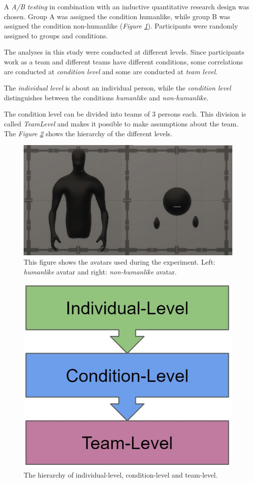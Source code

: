 \documentclass[sigchi]{acmart}
\begin{document}
A \textit{A/B testing} in combination with an inductive quantitative research design was chosen.
Group A was assigned the condition humanlike, while group B was assigned the condition non-humanlike (\textit{Figure \ref{Avatars}}). Participants were randomly assigned to groups and conditions. 

The analyses in this study were conducted at different levels.
Since participants work as a team and different teams have different conditions, some correlations are conducted at \textit{condition level} and some are conducted at \textit{team level}.

The \textit{individual level} is about an individual person, while the \textit{condition level} distinguishes between the conditions \textit{humanlike} and \textit{non-humanlike}.

The condition level can be divided into teams of 3 persons each. This division is called \textit{TeamLevel} and makes it possible to make assumptions about the team. 
The \textit{Figure \ref{DifferentLevels}} shows the hierarchy of the different levels.

\begin{figure}[h]
  \centering
 		\includegraphics[width=0.60\linewidth]{Abbildungen/Avatars.JPG}
			\caption[The avatars]{This figure shows the avatars used during the experiment. Left: \textit{humanlike} avatar and right: \textit{non-humanlike} avatar.}
			\label{Avatars}
\end{figure}	

\begin{figure}[h]
  \centering
 		\includegraphics[width=0.40\linewidth]{Abbildungen/DifferentLevels.JPG}	
			\caption[The hierarchy levels]{The hierarchy of individual-level, condition-level and team-level.}
			\label{DifferentLevels}
\end{figure}	
	
\end{document}
